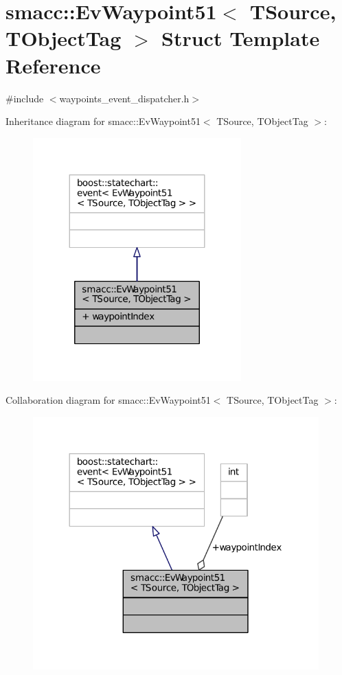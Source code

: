 \hypertarget{structsmacc_1_1EvWaypoint51}{}\section{smacc\+:\+:Ev\+Waypoint51$<$ T\+Source, T\+Object\+Tag $>$ Struct Template Reference}
\label{structsmacc_1_1EvWaypoint51}


{\ttfamily \#include $<$waypoints\+\_\+event\+\_\+dispatcher.\+h$>$}



Inheritance diagram for smacc\+:\+:Ev\+Waypoint51$<$ T\+Source, T\+Object\+Tag $>$\+:
\nopagebreak
\begin{figure}[H]
\begin{center}
\leavevmode
\includegraphics[width=227pt]{structsmacc_1_1EvWaypoint51__inherit__graph}
\end{center}
\end{figure}


Collaboration diagram for smacc\+:\+:Ev\+Waypoint51$<$ T\+Source, T\+Object\+Tag $>$\+:
\nopagebreak
\begin{figure}[H]
\begin{center}
\leavevmode
\includegraphics[width=312pt]{structsmacc_1_1EvWaypoint51__coll__graph}
\end{center}
\end{figure}
